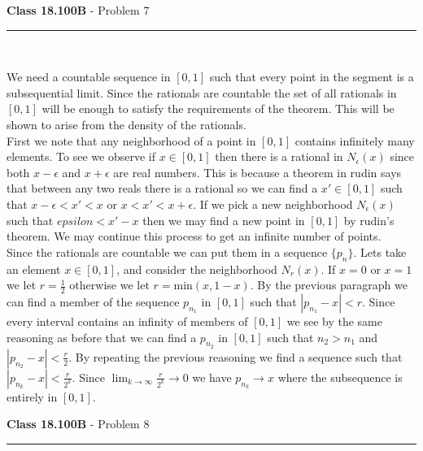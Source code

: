 \documentclass[11pt,reqno]{article}
\begin{document}
\vspace{15pt}
\begin{flushleft} 
\textbf{Class 18.100B} - Problem 7\\
\rule{500pt}{1pt}\\
\end{flushleft} 

We need a countable sequence in $[0,1]$ such that every point in the segment is a subsequential limit. Since the rationals are countable the set of all rationals in $[0,1]$ will be enough to satisfy the requirements of the theorem. This will be shown to arise from the density of the rationals.\\
\indent First we note that any neighborhood of a point in $[0,1]$ contains infinitely many elements. To see we observe if $x \in [0,1]$ then there is a rational in $N_\epsilon(x)$ since both $x-\epsilon$ and $x+\epsilon$ are real numbers. This is because a theorem in rudin says that between any two reals there is a rational so we can find a $x' \in [0,1]$ such that $x-\epsilon < x' < x$ or $x < x' < x + \epsilon$. If we pick a new neighborhood $N_\epsilon(x)$ such that $epsilon < x' - x$ then we may find a new point in $[0,1]$ by rudin's theorem. We may continue this process to get an infinite number of points.\\
\indent Since the rationals are countable we can put them in a sequence $\{ p_n \}$. Lets take an element $x \in [0,1]$, and consider the neighborhood $N_r(x)$. If $x = 0$ or $x = 1$ we let $r = \frac{1}{2}$ otherwise we let $r = \text{min}(x,1-x)$. By the previous paragraph we can find a member of the sequence  $p_{n_1}$ in $[0,1]$ such that $|p_{n_1} -x| < r$. Since every interval contains an infinity of members of $[0,1]$ we see by the same reasoning as before that we can find a $p_{n_2}$ in $[0,1]$ such that $n_2 > n_1$ and $|p_{n_2} - x| < \frac{r}{2}$. By repeating the previous reasoning we find a sequence such that $|p_{n_k} - x| < \frac{r}{2^k}$. Since $\lim_{k \to \infty} \frac{r}{2^k} \to 0$ we have $p_{n_k} \to x$ where the subsequence is entirely in $[0,1]$.

\vspace{15pt}
\begin{flushleft} 
\textbf{Class 18.100B} - Problem 8\\
\rule{500pt}{1pt}\\
\end{flushleft} 
\end{document}

